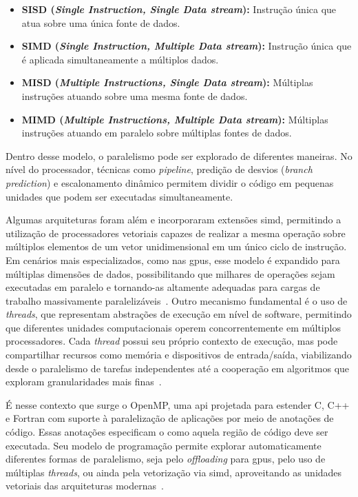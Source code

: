 \begin{itemize}
    \item \textbf{SISD (\textit{Single Instruction, Single Data stream}):} Instrução única que atua sobre uma única fonte de dados.
    \item \textbf{SIMD (\textit{Single Instruction, Multiple Data stream}):} Instrução única que é aplicada simultaneamente a múltiplos dados.
    \item \textbf{MISD (\textit{Multiple Instructions, Single Data stream}):} Múltiplas instruções atuando sobre uma mesma fonte de dados.
    \item \textbf{MIMD (\textit{Multiple Instructions, Multiple Data stream}):} Múltiplas instruções atuando em paralelo sobre múltiplas fontes de dados.
\end{itemize}

Dentro desse modelo, o paralelismo pode ser explorado de diferentes maneiras. No nível do processador, técnicas como \textit{pipeline}, predição de desvios (\textit{branch prediction}) e escalonamento dinâmico permitem dividir o código em pequenas unidades que podem ser executadas simultaneamente.

Algumas arquiteturas foram além e incorporaram extensões \gls{simd}, permitindo a utilização de processadores vetoriais capazes de realizar a mesma operação sobre múltiplos elementos de um vetor unidimensional em um único ciclo de instrução. Em cenários mais especializados, como nas \glspl{gpu}, esse modelo é expandido para múltiplas dimensões de dados, possibilitando que milhares de operações sejam executadas em paralelo e tornando-as altamente adequadas para cargas de trabalho massivamente paralelizáveis~\cite{hennessy2017}. Outro mecanismo fundamental é o uso de \textit{threads}, que representam abstrações de execução em nível de software, permitindo que diferentes unidades computacionais operem concorrentemente em múltiplos processadores. Cada \textit{thread} possui seu próprio contexto de execução, mas pode compartilhar recursos como memória e dispositivos de entrada/saída, viabilizando desde o paralelismo de tarefas independentes até a cooperação em algoritmos que exploram granularidades mais finas~\cite{tanenbaum2015,hennessy2017}.

É nesse contexto que surge o OpenMP, uma \gls{api} projetada para estender C, C++ e Fortran com suporte à paralelização de aplicações por meio de anotações de código. Essas anotações especificam o como aquela região de código deve ser executada. Seu modelo de programação permite explorar automaticamente diferentes formas de paralelismo, seja pelo \textit{offloading} para \glspl{gpu}, pelo uso de múltiplas \textit{threads}, ou ainda pela vetorização via \gls{simd}, aproveitando as unidades vetoriais das arquiteturas modernas~\cite{mattson2019}.

